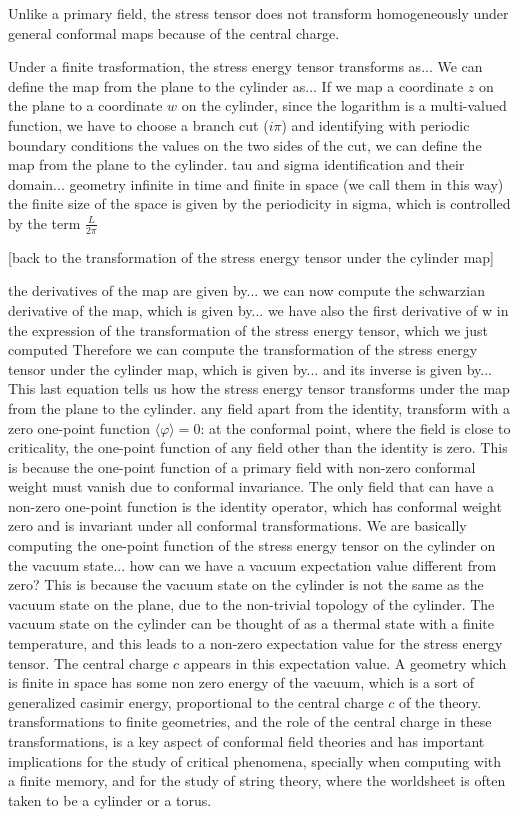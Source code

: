 Unlike a primary field, the stress tensor does not transform homogeneously under general conformal maps because of the central charge.

Under a finite trasformation, the stress energy tensor transforms as...
We can define the map from the plane to the cylinder as...
If we map a coordinate \(z\) on the plane to a coordinate \(w\) on the cylinder, since the logarithm is a multi-valued function, we have to choose a branch cut (\(i\pi\)) and identifying with periodic boundary conditions the values on the two sides of the cut, we can define the map from the plane to the cylinder.
tau and sigma identification and their domain...
geometry infinite in time and finite in space (we call them in this way)
the finite size of the space is given by the periodicity in sigma, which is controlled by the term \(\frac{L}{2\pi}\)

[back to the transformation of the stress energy tensor under the cylinder map]

the derivatives of the map are given by...
we can now compute the schwarzian derivative of the map, which is given by...
we have also the first derivative of w in the expression of the transformation of the stress energy tensor, which we just computed
Therefore we can compute the transformation of the stress energy tensor under the cylinder map, which is given by... and its inverse is given by...
This last equation tells us how the stress energy tensor transforms under the map from the plane to the cylinder. any field apart from the identity, transform with a zero one-point function \(\langle \varphi \rangle=0\): at the conformal point, where the field is close to criticality, the one-point function of any field other than the identity is zero. This is because the one-point function of a primary field with non-zero conformal weight must vanish due to conformal invariance. The only field that can have a non-zero one-point function is the identity operator, which has conformal weight zero and is invariant under all conformal transformations. 
We are basically computing the one-point function of the stress energy tensor on the cylinder on the vacuum state... how can we have a vacuum expectation value different from zero? This is because the vacuum state on the cylinder is not the same as the vacuum state on the plane, due to the non-trivial topology of the cylinder. The vacuum state on the cylinder can be thought of as a thermal state with a finite temperature, and this leads to a non-zero expectation value for the stress energy tensor. The central charge \(c\) appears in this expectation value. A geometry which is finite in space has some non zero energy of the vacuum, which is a sort of generalized casimir energy, proportional to the central charge \(c\) of the theory.
transformations to finite geometries, and the role of the central charge in these transformations, is a key aspect of conformal field theories and has important implications for the study of critical phenomena, specially when computing with a finite memory, and for the study of string theory, where the worldsheet is often taken to be a cylinder or a torus.


